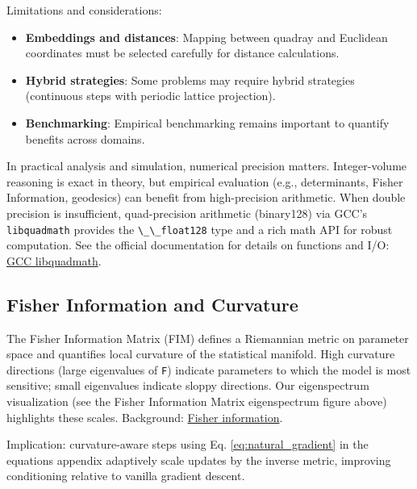 \documentclass[
  10pt,
]{article}
\newcommand{\passthrough}[1]{#1}
\providecommand{\tightlist}{%
  \setlength{\itemsep}{0pt}\setlength{\parskip}{0pt}}
\begin{document}
Limitations and considerations:

\begin{itemize}
\tightlist
\item
  \textbf{Embeddings and distances}: Mapping between quadray and
  Euclidean coordinates must be selected carefully for distance
  calculations.
\item
  \textbf{Hybrid strategies}: Some problems may require hybrid
  strategies (continuous steps with periodic lattice projection).
\item
  \textbf{Benchmarking}: Empirical benchmarking remains important to
  quantify benefits across domains.
\end{itemize}

In practical analysis and simulation, numerical precision matters.
Integer-volume reasoning is exact in theory, but empirical evaluation
(e.g., determinants, Fisher Information, geodesics) can benefit from
high-precision arithmetic. When double precision is insufficient,
quad-precision arithmetic (binary128) via GCC's
\passthrough{\lstinline!libquadmath!} provides the
\passthrough{\lstinline!\_\_float128!} type and a rich math API for
robust computation. See the official documentation for details on
functions and I/O:
\href{https://gcc.gnu.org/onlinedocs/libquadmath/index.html}{GCC
libquadmath}.

\hypertarget{fisher-information-and-curvature}{%
\subsection{Fisher Information and
Curvature}\label{fisher-information-and-curvature}}

The Fisher Information Matrix (FIM) defines a Riemannian metric on
parameter space and quantifies local curvature of the statistical
manifold. High curvature directions (large eigenvalues of
\passthrough{\lstinline!F!}) indicate parameters to which the model is
most sensitive; small eigenvalues indicate sloppy directions. Our
eigenspectrum visualization (see the Fisher Information Matrix
eigenspectrum figure above) highlights these scales. Background:
\href{https://en.wikipedia.org/wiki/Fisher_information}{Fisher
information}.

Implication: curvature-aware steps using Eq. \eqref{eq:natural_gradient}
in the equations appendix adaptively scale updates by the inverse
metric, improving conditioning relative to vanilla gradient descent.
\end{document}
